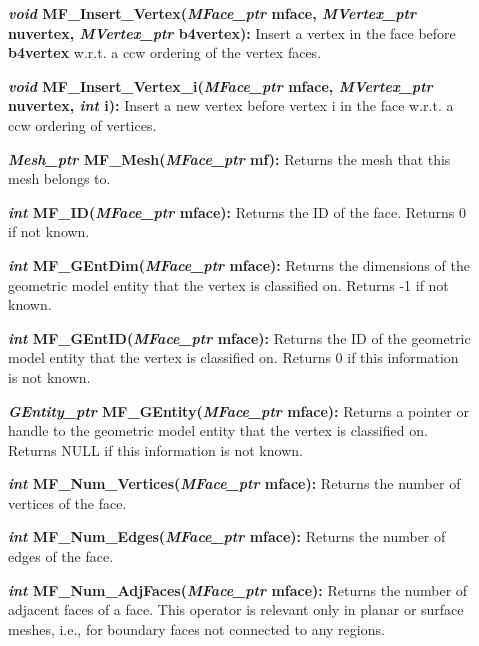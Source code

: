 \documentclass[12pt]{article}
\begin{document}
\begin{description}
\item[]{\bf {\em void} MF\_Insert\_Vertex({\em MFace\_ptr} mface,
{\em MVertex\_ptr} nuvertex, {\em MVertex\_ptr} b4vertex):}
Insert a vertex in the face before {\bf b4vertex} w.r.t. a ccw
ordering of the vertex faces. 

\item[]{\bf {\em void} MF\_Insert\_Vertex\_i({\em MFace\_ptr}
mface, {\em MVertex\_ptr} nuvertex, {\em int} i):} Insert a new
vertex before vertex i in the face w.r.t. a ccw ordering of vertices.

\item[]

\item[]{\bf {\em Mesh\_ptr} MF\_Mesh({\em MFace\_ptr} mf):} Returns the mesh that this mesh belongs to.

\item[]{\bf {\em int} MF\_ID({\em MFace\_ptr} mface):} Returns the ID of the face. Returns 0 if not known.

\item[]{\bf {\em int} MF\_GEntDim({\em MFace\_ptr} mface):} Returns the dimensions of the geometric model entity that the vertex is classified on. Returns -1 if not known.

\item[]{\bf {\em int} MF\_GEntID({\em MFace\_ptr} mface):} Returns the ID of the geometric model entity that the vertex is classified on. Returns 0 if this information is not known.

\item[]{\bf {\em GEntity\_ptr} MF\_GEntity({\em MFace\_ptr} mface):} Returns a pointer or handle to the geometric model entity that the vertex is classified on. Returns NULL if this information is not known.

\item[]

\item[]{\bf {\em int} MF\_Num\_Vertices({\em MFace\_ptr} mface):} Returns the number of vertices of the face.

\item[]{\bf {\em int} MF\_Num\_Edges({\em MFace\_ptr} mface):} Returns the number of edges of the face.
  
\item[]{\bf {\em int} MF\_Num\_AdjFaces({\em MFace\_ptr}
    mface):} Returns the number of adjacent faces of a face. This
  operator is relevant only in planar or surface meshes, i.e., for
  boundary faces not connected to any regions.
  

\end{description}
\end{document}
